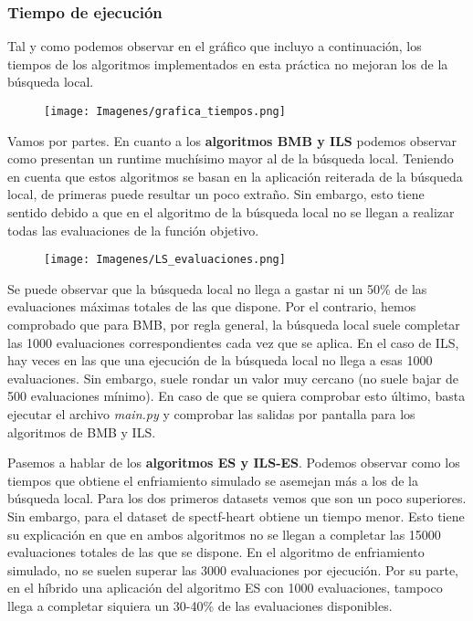 \documentclass[10pt, a4paper]{article}
\theoremstyle{theorem-style}
\theoremstyle{theorem-style}
\theoremstyle{theorem2-style}
\theoremstyle{definition-style}
\theoremstyle{remark-style}
\theoremstyle{example-style}
\theoremstyle{definition-style}
\theoremstyle{remark-style}
\theoremstyle{remark-style}
\begin{document}
\subsubsection{Tiempo de ejecución}

Tal y como podemos observar en el gráfico que incluyo a continuación, los tiempos de los algoritmos implementados en esta práctica no mejoran los de la búsqueda local.

\begin{figure}[htp]
\centering
\texttt{[image: Imagenes/grafica\_tiempos.png]}
\label{}
\end{figure} Vamos por partes. En cuanto a los \textbf{algoritmos BMB y ILS} podemos observar como presentan un runtime muchísimo mayor al de la búsqueda local. Teniendo en cuenta que estos algoritmos se basan en la aplicación reiterada de la búsqueda local, de primeras puede resultar un poco extraño. Sin embargo, esto tiene sentido debido a que en el algoritmo de la búsqueda local no se llegan a realizar todas las evaluaciones de la función objetivo. 

\begin{figure}[htp]
\centering
\texttt{[image: Imagenes/LS\_evaluaciones.png]}

\label{}
\end{figure}

Se puede observar que la búsqueda local no llega a gastar ni un 50\% de las evaluaciones máximas totales de las que dispone. Por el contrario, hemos comprobado que para BMB, por regla general, la búsqueda local suele completar las 1000 evaluaciones correspondientes cada vez que se aplica. En el caso de ILS, hay veces en las que una ejecución de la búsqueda local no llega a esas 1000 evaluaciones. Sin embargo, suele rondar un valor muy cercano (no suele bajar de 500 evaluaciones mínimo). En caso de que se quiera comprobar esto último, basta ejecutar el archivo \textit{main.py} y comprobar las salidas por pantalla para los algoritmos de BMB y ILS. 

Pasemos a hablar de los \textbf{algoritmos ES y ILS-ES}. Podemos observar como los tiempos que obtiene el enfriamiento simulado se asemejan más a los de la búsqueda local. Para los dos primeros datasets vemos que son un poco superiores. Sin embargo, para el dataset de spectf-heart obtiene un tiempo menor. Esto tiene su explicación en que en ambos algoritmos no se llegan a completar las 15000 evaluaciones totales de las que se dispone. En el algoritmo de enfriamiento simulado, no se suelen superar las 3000 evaluaciones por ejecución. Por su parte, en el híbrido una aplicación del algoritmo ES con 1000 evaluaciones, tampoco llega a completar siquiera un 30-40\% de las evaluaciones disponibles. 
\end{document}
